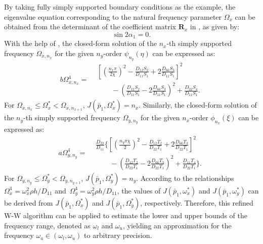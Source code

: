 \documentclass[preprint,12pt]{elsarticle}
\begin{document}
By taking fully simply supported boundary conditions as the example, the eigenvalue equation corresponding to the natural frequency parameter $ \Omega_x $ can be obtained from the determinant of the coefficient matrix $ \mathbf{R}_x $ in , as given by:
%
\begin{equation}\label{eq:SSx} 
	\sin 2\alpha_1 = 0.
\end{equation}
%
With the help of , the closed-form solution of the $n_x$-th simply supported frequency $\Omega_{x,n_x}$ for the given $n_y$-order $\psi_{n_y}(\eta)$ can be expressed as:
%
\begin{equation}\label{eq:J_simpx}
	b \Omega^4_{x,n_x} =
		\begin{aligned}
			&\left[\left(\frac{n_x\pi}{2\chi}\right)^2 - \frac{D_{12}S_2}{D_{11}S_1} + 2 \frac{D_{66}S_3}{D_{11}S_1}\right]^2 \\
			&\qquad- \left(\frac{D_{12}S_2}{D_{11}S_1} - 2 \frac{D_{66}S_3}{D_{11}S_1}\right)^2
			+ \frac{D_{22}S_4}{D_{11}S_1}.
		\end{aligned}
\end{equation}
%
For $\Omega_{x,n_x} \leq \Omega_x^* < \Omega_{x,n_{x+1}}$, $J(\bar{p}_1, \Omega_x^*) = n_x$.
Similarly, the closed-form solution of the $n_y$-th simply supported frequency $\Omega_{y,n_y}$ for the given $n_x$-order $\phi_{n_x}(\xi)$ can be expressed as:
%
\begin{equation}\label{eq:J_simpy}
	a\Omega^4_{y,n_y}= 
		\begin{aligned}
			&\frac{D_{22}}{D_{11}}\Biggl\{\left[\left(\frac{n_y\pi\chi}{2}\right)^2 - \frac{D_{12}T_2}{D_{22}T_1} + 2 \frac{D_{66}T_3}{D_{22}T_1}\right]^2 \\ 
			&\qquad - \left(\frac{D_{12}T_2}{D_{22}T_1} - 2 \frac{D_{66}T_3}{D_{22}T_1}\right)^2
			+ \frac{D_{11}T_4}{D_{22}T_1}\Biggr\}.
		\end{aligned}
\end{equation}
%
For $\Omega_{y,n_y} \leq \Omega_y^* < \Omega_{y,n_{y+1}}$, $J(\bar{p}_1, \Omega_y^*) = n_y$.
According to the relationships 
$\Omega^4_x = {{\omega_x^2 \rho h}/{D_{11}}}$ and\ $\Omega^4_y = {{\omega_y^2 \rho h}/{D_{11}}}$, 
the values of $J(\bar{p}_1, \omega_x^*)$ and $J(\bar{p}_1, \omega_y^*)$ can be derived from $J(\bar{p}_1, \Omega_x^*)$ and $J(\bar{p}_1, \Omega_y^*)$, respectively. Therefore, this refined W-W algorithm can be applied to estimate the lower and upper bounds of the frequency range, denoted as $\omega_l$ and $\omega_u$, yielding an approximation for the frequency $\omega_a \in (\omega_l, \omega_u)$ to arbitrary precision.
\end{document}
